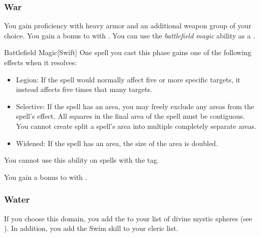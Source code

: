         \subsubsection{War}
             You gain proficiency with heavy armor and an additional weapon group of your choice.
             You gain a  bonus to  with .
             You can use the \textit{battlefield magic} ability as a .
            \begin{apability}{Battlefield Magic}[Swift]
                One spell you cast this phase gains one of the following effects when it resolves:
                \begin{itemize}
                    \item Legion: If the spell would normally affect five or more specific targets, it instead affects five times that many targets.
                    \item Selective: If the spell has an area, you may freely exclude any areas from the spell's effect.
                    All squares in the final area of the spell must be contiguous.
                    You cannot create split a spell's area into multiple completely separate areas.
                    \item Widened: If the spell has an area, the size of the area is doubled.
                \end{itemize}
                You cannot use this ability on spells with the  tag.
            \end{apability}
             You gain a  bonus to  with .

        \subsubsection{Water}
            If you choose this domain, you add the   to your list of divine mystic spheres (see ).
            In addition, you add the Swim skill to your cleric  list.

